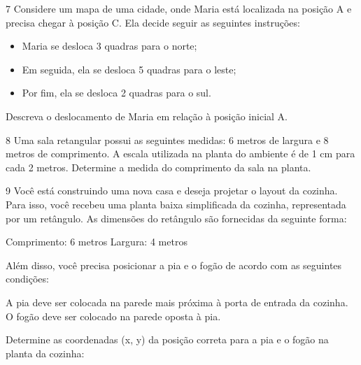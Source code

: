 \num{7} Considere um mapa de uma cidade, onde Maria está localizada na
posição A e precisa chegar à posição C. Ela decide seguir as seguintes
instruções:

\begin{itemize}
\item Maria se desloca 3 quadras para o norte;
\item Em seguida, ela se desloca 5 quadras para o leste;
\item Por fim, ela se desloca 2 quadras para o sul.
\end{itemize}

Descreva o deslocamento de Maria em relação à posição inicial A.


\num{8} Uma sala retangular possui as seguintes medidas: 6 metros de largura
e 8 metros de comprimento. A escala utilizada na planta do ambiente é de
1 cm para cada 2 metros. Determine a medida do comprimento da sala na
planta.


\num{9} Você está construindo uma nova casa e deseja projetar o layout da
cozinha. Para isso, você recebeu uma planta baixa simplificada da
cozinha, representada por um retângulo. As dimensões do retângulo são
fornecidas da seguinte forma:

Comprimento: 6 metros Largura: 4 metros

Além disso, você precisa posicionar a pia e o fogão de acordo com as
seguintes condições:

A pia deve ser colocada na parede mais próxima à porta de entrada da
cozinha. O fogão deve ser colocado na parede oposta à pia.

Determine as coordenadas (x, y) da posição correta para a pia e o fogão
na planta da cozinha:

